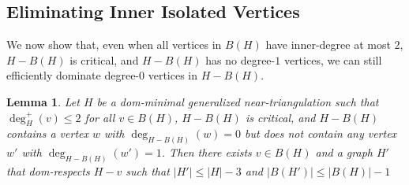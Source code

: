 \documentclass[11pt]{article}
\newcommand{\pat}[1]{\textcolor{red}{PM: #1}}
\newcommand{\hussein}[1]{\textcolor{purple}{HH: #1}}
\newtheorem{lem}{Lemma}
\theoremstyle{definition}
\begin{document}
\subsection{Eliminating Inner Isolated Vertices}
\label{zero_kill_sec}

We now show that, even when all vertices in $B(H)$ have inner-degree at most $2$, $H-B(H)$ is critical, and $H-B(H)$ has no degree-$1$ vertices, we can still efficiently dominate degree-$0$ vertices in $H-B(H)$.

\begin{lem}\label{degree_zero_killer}
  Let $H$ be a dom-minimal generalized near-triangulation such that $\deg^+_H(v)\le 2$ for all $v\in B(H)$, $H-B(H)$ is critical, and $H-B(H)$ contains a vertex $w$ with $\deg_{H-B(H)}(w)=0$ but does not contain any vertex $w'$ with $\deg_{H-B(H)}(w')=1$.  Then
    there exists $v\in B(H)$ and a graph $H'$ that dom-respects $H-v$ such that $|H'|\le |H|-3$ and $|B(H')|\le |B(H)|-1$
\end{lem}

%
%
\end{document}
